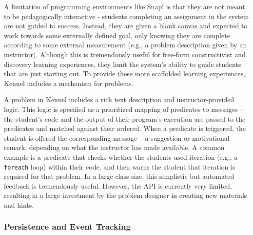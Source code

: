 A limitation of programming environments like Snap! is that they are not meant to be pedagogically interactive - students completing an assignment in the system are not guided to success.
Instead, they are given a blank canvas and expected to work towards some externally defined goal, only knowing they are complete according to some external measurement (e.g., a problem description given by an instructor).
Although this is tremendously useful for free-form constructivist and discovery learning experiences, they limit the system's ability to guide students that are just starting out.
To provide these more scaffolded learning experiences, Kennel includes a mechanism for problems.

A problem in Kennel includes a rich text description and instructor-provided logic.
This logic is specified as a prioritized mapping of predicates to messages -- the student's code and the output of their program's execution are passed to the predicates and matched against their ordered.
When a predicate is triggered, the student is offered the corresponding message -- a suggestion or motivational remark, depending on what the instructor has made available.
A common example is a predicate that checks whether the students used iteration (e.g., a \texttt{foreach} loop) within their code, and then warns the student that iteration is required for that problem.
In a large class size, this simplistic but automated feedback is tremendously useful.
However, the API is currently very limited, resulting in a large investment by the problem designer in creating new materials and hints.

\subsubsection{Persistence and Event Tracking}

